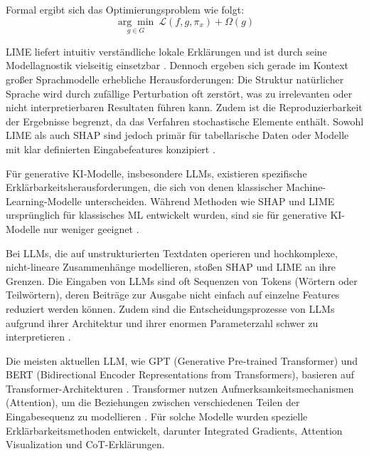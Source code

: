     Formal ergibt sich das Optimierungsproblem wie folgt:
    \begin{equation}
    \underset{g \in G}{\arg \min} \ \mathcal{L}(f, g, \pi_x) + \Omega(g)
    \end{equation}

    \acs{LIME} liefert intuitiv verständliche lokale Erklärungen und ist durch seine Modellagnostik vielseitig einsetzbar \autocite[S. 2-3]{lundberg2017}.
    Dennoch ergeben sich gerade im Kontext großer Sprachmodelle erhebliche Herausforderungen: Die Struktur natürlicher Sprache wird durch zufällige Perturbation oft zerstört, was zu irrelevanten oder nicht interpretierbaren Resultaten führen kann.
    Zudem ist die Reproduzierbarkeit der Ergebnisse begrenzt, da das Verfahren stochastische Elemente enthält.
    Sowohl \acs{LIME} als auch \acs{SHAP} sind jedoch primär für tabellarische Daten oder Modelle mit klar definierten Eingabefeatures konzipiert \autocite{lundberg2017}.

    Für generative KI-Modelle, insbesondere \acs{LLM}s, existieren spezifische Erklärbarkeitsherausforderungen, die sich von denen klassischer Machine-Learning-Modelle unterscheiden.
    Während Methoden wie \acs{SHAP} und \acs{LIME} ursprünglich für klassisches \acs{ML} entwickelt wurden, sind sie für generative \acs{KI}-Modelle nur weniger geeignet \autocite[S. 1]{lundberg2017}.


    Bei \acs{LLM}s, die auf unstrukturierten Textdaten operieren und hochkomplexe, nicht-lineare Zusammenhänge modellieren, stoßen \acs{SHAP} und \acs{LIME} an ihre Grenzen.
    Die Eingaben von \acs{LLM}s sind oft Sequenzen von Tokens (Wörtern oder Teilwörtern), deren Beiträge zur Ausgabe nicht einfach auf einzelne Features reduziert werden können.
    Zudem sind die Entscheidungsprozesse von \acs{LLM}s aufgrund ihrer Architektur und ihrer enormen Parameterzahl schwer zu interpretieren \autocite[S. 2]{vaswani2017}.

    Die meisten aktuellen \acs{LLM}, wie \acs{GPT} (Generative Pre-trained Transformer) und \acs{BERT} (Bidirectional Encoder Representations from Transformers), basieren auf Transformer-Architekturen \autocite{radford2018, devlin2018}.
    Transformer nutzen Aufmerksamkeitsmechanismen (Attention), um die Beziehungen zwischen verschiedenen Teilen der Eingabesequenz zu modellieren \autocite[S. 2]{vaswani2017}.
    Für solche Modelle wurden spezielle Erklärbarkeitsmethoden entwickelt, darunter Integrated Gradients, Attention Visualization und \acs{CoT}-Erklärungen.

